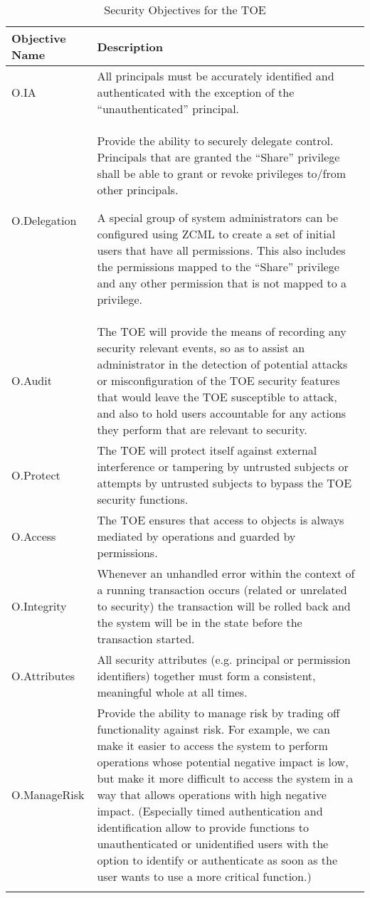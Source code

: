 \documentclass[12pt,english]{scrbook}
\begin{document}
\begin{longtable}[c]{lp{10cm}}
  \toprule
  Objective Name & Description \\
  \midrule\endhead
  
  O.IA
   & 
  All principals must be accurately identified and
  authenticated with the exception of the ``unauthenticated''
  principal.
   \\

  O.Delegation
   & 

  Provide the ability to securely delegate control. Principals that are granted
  the ``Share'' privilege shall be able to grant or revoke privileges to/from
  other principals.
  
  A special group of system administrators can be configured using ZCML to
  create a set of initial users that have all permissions. This also includes
  the permissions mapped to the ``Share'' privilege and any other permission
  that is not mapped to a privilege.

  \\

  O.Audit
   & 
  The TOE will provide the means of recording any
  security relevant events, so as to assist an
  administrator in the detection of potential attacks
  or misconfiguration of the TOE security features
  that would leave the TOE susceptible to attack, and
  also to hold users accountable for any actions
  they perform that are relevant to security.
   \\

  O.Protect
   & 
  The TOE will protect itself against external
  interference or tampering by untrusted subjects or
  attempts by untrusted subjects to bypass the TOE
  security functions.
   \\

  O.Access
   & 
  The TOE ensures that access to objects is always
  mediated by operations and guarded by permissions.
   \\

  O.Integrity
   & 
  Whenever an unhandled error within the context of a
  running transaction occurs (related or unrelated
  to security) the transaction will be rolled back
  and the system will be in the state before the
  transaction started.
   \\

  O.Attributes &  All security attributes (e.g. principal or permission
    identifiers) together must form a consistent, meaningful whole at all
    times. \\

  O.ManageRisk
   & 
  Provide the ability to manage risk by trading off functionality against risk.
  For example, we can make it easier to access the system to perform operations
  whose potential negative impact is low, but make it more difficult to access
  the system in a way that allows operations with high negative impact.
  (Especially timed authentication and identification allow to provide
  functions to unauthenticated or unidentified users with the option to
  identify or authenticate as soon as the user wants to use a more critical
  function.)
  \\
  \bottomrule
  \caption{Security Objectives for the TOE}
\end{longtable}
\end{document}
